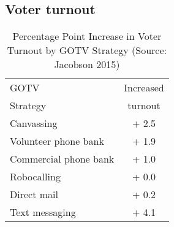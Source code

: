 \documentclass[10pt]{article}
\begin{document}
	
	\subsection{Voter turnout}
	
	
	\begin{table}[h]
		\centering
		\begin{tabular}{lc}
			\toprule
			GOTV & Increased \\ 
			Strategy& turnout   \\ 
			\midrule
			Canvassing & + 2.5\\
			Volunteer phone bank & + 1.9 \\
			Commercial phone bank & + 1.0\\
			Robocalling & + 0.0 \\
			Direct mail & + 0.2\\
			Text messaging & + 4.1\\
			\bottomrule
		\end{tabular}
		\caption{Percentage Point Increase in Voter Turnout by GOTV Strategy (Source: Jacobson 2015)}
	\end{table}
	
	
	
\end{document}
